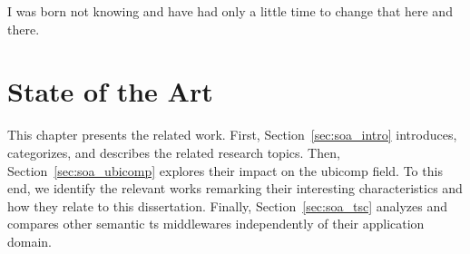 
\begin{savequote}[50mm]
I was born not knowing and have had only a little time to change that here and there.
\end{savequote}


\chapter{State of the Art}
\label{cha:stateoftheart}
\newcommand{\pathchaptwo}{2_state_of_the_art}

\ifpdf
    \graphicspath{{\pathchaptwo/figures/PNG/}{\pathchaptwo/figures/PDF/}{\pathchaptwo/figures/}}
\else
    \graphicspath{{\pathchaptwo/figures/EPS/}{\pathchaptwo/figures/}}
\fi



This chapter presents the related work.
First, Section~\ref{sec:soa_intro} introduces, categorizes, and describes the related research topics. %
Then, Section~\ref{sec:soa_ubicomp} explores their impact on the \ac{ubicomp} field. %
To this end, we identify the relevant works remarking their interesting characteristics and how they relate to this dissertation.
Finally, Section~\ref{sec:soa_tsc} analyzes and compares other semantic \ac{ts} middlewares independently of their application domain.












